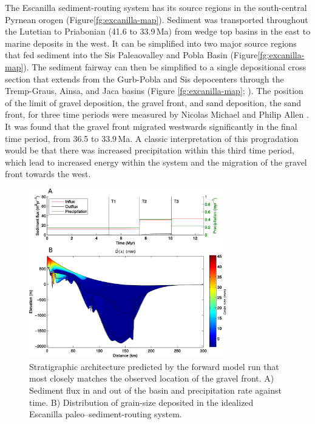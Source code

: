 The Escanilla sediment-routing system has its source regions in the south-central Pyrnean orogen (Figure\ref{fg:excanilla-map}). Sediment was transported throughout the Lutetian to Priabonian (41.6 to 33.9\,Ma) from wedge top basins in the east to marine deposits in the west. It can be simplified into two major source regions that fed sediment into the Sis Paleaovalley and Pobla Basin (Figure\ref{fg:excanilla-map}). The sediment fairway can then be simplified to a single depositional cross section that extends from the Gurb-Pobla and Sis depocenters through the Tremp-Graus, Ainsa, and Jaca basins (Figure \ref{fg:excanilla-map}; \citep{michael-etal-2013}). The position of the limit of gravel deposition, the gravel front, and sand deposition, the sand front, for three time periods were measured by Nicolas Michael and Philip Allen \citep{michael-etal-2013}. It was found that the gravel front migrated westwards significantly in the final time period, from 36.5 to 33.9\,Ma. A classic interpretation of this progradation would be that there was increased precipitation within this third time period, which lead to increased energy within the system and the migration of the gravel front towards the west.

\begin{figure}
\centering
\includegraphics[width=8.6cm]{./figures/ch2-escanilla-model.pdf}
\caption{Stratigraphic architecture predicted by the forward model run that most closely matches the observed location of the gravel front. A) Sediment flux in and out of the basin and precipitation rate against time. B) Distribution of grain-size deposited in the idealized Escanilla paleo--sediment-routing system.}
\label{fg:escanilla-model}
\end{figure}

